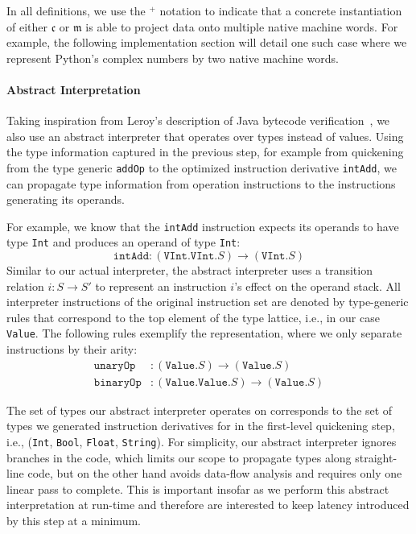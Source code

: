 \documentclass[preprint,10pt]{popl14conf}
\begin{document}
In all definitions, we use the $^{+}$ notation to indicate that a concrete instantiation of either
$\mathfrak{c}$ or $\mathfrak{m}$ is able to project data onto multiple native machine words.
For example, the following implementation section will detail one such case where we represent
Python's complex numbers by two native machine words.

\paragraph{Abstract Interpretation}

Taking inspiration from Leroy's description of Java bytecode verification~\cite{leroy+03}, we also
use an abstract interpreter that operates over types instead of values.
Using the type information captured in the previous step, for example from quickening from the type
generic \texttt{addOp} to the optimized instruction derivative \texttt{intAdd}, we can propagate
type information from operation instructions to the instructions generating its operands.

For example, we know that the \texttt{intAdd} instruction expects its operands to have type
\texttt{Int} and produces an operand of type \texttt{Int}:
\begin{equation*}
  \mathtt{intAdd} : (\mathtt{VInt}.\mathtt{VInt}.S) \rightarrow (\mathtt{VInt}.S)
\end{equation*}
Similar to our actual interpreter, the abstract interpreter uses a transition relation $i: S
\rightarrow S'$
to represent an instruction $i$'s effect on the operand stack.
All interpreter instructions of the original instruction set are denoted by type-generic rules that
correspond to the top element of the type lattice, i.e., in our case \texttt{Value}.
The following rules exemplify the representation, where we only separate instructions by their
arity:
\begin{align*}
  \mathtt{unaryOp}  &: (\mathtt{Value}.S) \rightarrow (\mathtt{Value}.S) \\
  \mathtt{binaryOp} &: (\mathtt{Value}.\mathtt{Value}.S) \rightarrow (\mathtt{Value}.S)
\end{align*}

The set of types our abstract interpreter operates on corresponds to the set of types we generated
instruction derivatives for in the first-level quickening step, i.e., (\texttt{Int}, \texttt{Bool},
\texttt{Float}, \texttt{String}).
For simplicity, our abstract interpreter ignores branches in the code, which limits our scope to
propagate types along straight-line code, but on the other hand avoids data-flow analysis and
requires only one linear pass to complete.
This is important insofar as we perform this abstract interpretation at run-time and therefore are
interested to keep latency introduced by this step at a minimum.
\end{document}

